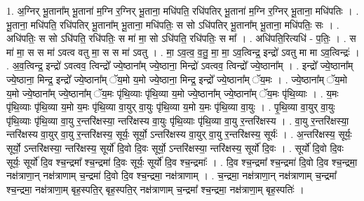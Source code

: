 \documentclass[17pt]{extarticle}
\begin{document}
1. अ॒ग्निर् भू॒ताना᳚म् भू॒ताना॑ म॒ग्नि र॒ग्निर् भू॒ताना॒ मधि॑पति॒ रधि॑पतिर् भू॒ताना॑ म॒ग्नि र॒ग्निर् भू॒ताना॒ मधि॑पतिः । . भू॒ताना॒ मधि॑पति॒ रधि॑पतिर् भू॒ताना᳚म् भू॒ताना॒ मधि॑पतिः॒ स सो ऽधि॑पतिर् भू॒ताना᳚म् भू॒ताना॒ मधि॑पतिः॒ सः । . अधि॑पतिः॒ स सो ऽधि॑पति॒ रधि॑पतिः॒ स मा॑ मा॒ सो ऽधि॑पति॒ रधि॑पतिः॒ स मा᳚ । . अधि॑पति॒रित्यधि॑ - प॒तिः॒ । . स मा॑ मा॒ स स मा॑ ऽवत्व वतु मा॒ स स मा॑ ऽवतु । . मा॒ ऽव॒त्व॒ व॒तु॒ मा॒ मा॒ ऽव॒त्विन्द्र॒ इन्द्रो॑ ऽवतु मा मा ऽव॒त्विन्द्रः॑ । . अ॒व॒त्विन्द्र॒ इन्द्रो॑ ऽवत्वव॒ त्विन्द्रो᳚ ज्ये॒ष्ठाना᳚म् ज्ये॒ष्ठाना॒ मिन्द्रो॑ ऽवत्वव॒ त्विन्द्रो᳚ ज्ये॒ष्ठाना᳚म् । . इन्द्रो᳚ ज्ये॒ष्ठाना᳚म् ज्ये॒ष्ठाना॒ मिन्द्र॒ इन्द्रो᳚ ज्ये॒ष्ठाना᳚म् ॅय॒मो य॒मो ज्ये॒ष्ठाना॒ मिन्द्र॒ इन्द्रो᳚ ज्ये॒ष्ठाना᳚म् ॅय॒मः । . ज्ये॒ष्ठाना᳚म् ॅय॒मो य॒मो ज्ये॒ष्ठाना᳚म् ज्ये॒ष्ठाना᳚म् ॅय॒मः पृ॑थि॒व्याः पृ॑थि॒व्या य॒मो ज्ये॒ष्ठाना᳚म् ज्ये॒ष्ठाना᳚म् ॅय॒मः पृ॑थि॒व्याः । . य॒मः पृ॑थि॒व्याः पृ॑थि॒व्या य॒मो य॒मः पृ॑थि॒व्या वा॒युर् वा॒युः पृ॑थि॒व्या य॒मो य॒मः पृ॑थि॒व्या वा॒युः । . पृ॒थि॒व्या वा॒युर् वा॒युः पृ॑थि॒व्याः पृ॑थि॒व्या वा॒यु र॒न्तरि॑क्षस्या॒ न्तरि॑क्षस्य वा॒युः पृ॑थि॒व्याः 
पृ॑थि॒व्या वा॒यु र॒न्तरि॑क्षस्य । . वा॒यु र॒न्तरि॑क्षस्या॒ न्तरि॑क्षस्य वा॒युर् वा॒यु र॒न्तरि॑क्षस्य॒ सूर्यः॒ सूर्यो॒ ऽन्तरि॑क्षस्य वा॒युर् वा॒यु
र॒न्तरि॑क्षस्य॒ सूर्यः॑ । . अ॒न्तरि॑क्षस्य॒ सूर्यः॒ सूर्यो॒ ऽन्तरि॑क्षस्या॒ न्तरि॑क्षस्य॒ सूर्यो॑ दि॒वो दि॒वः सूर्यो॒ ऽन्तरि॑क्षस्या॒ न्तरि॑क्षस्य॒ सूर्यो॑ दि॒वः । . सूर्यो॑ दि॒वो दि॒वः सूर्यः॒ सूर्यो॑ दि॒व श्च॒न्द्रमा᳚ श्च॒न्द्रमा॑ दि॒वः सूर्यः॒ सूर्यो॑ दि॒व श्च॒न्द्रमाः᳚ । . दि॒व श्च॒न्द्रमा᳚ श्च॒न्द्रमा॑ दि॒वो दि॒व श्च॒न्द्रमा॒ नक्ष॑त्राणा॒न् नक्ष॑त्राणाम् च॒न्द्रमा॑ दि॒वो दि॒व श्च॒न्द्रमा॒ नक्ष॑त्राणाम् । . च॒न्द्रमा॒ नक्ष॑त्राणा॒न् नक्ष॑त्राणाम् च॒न्द्रमा᳚ श्च॒न्द्रमा॒ नक्ष॑त्राणा॒म् बृह॒स्पति॒र् बृह॒स्पति॒र् नक्ष॑त्राणाम् च॒न्द्रमा᳚ श्च॒न्द्रमा॒ नक्ष॑त्राणा॒म् बृह॒स्पतिः॑ । \newline
\end{document}
